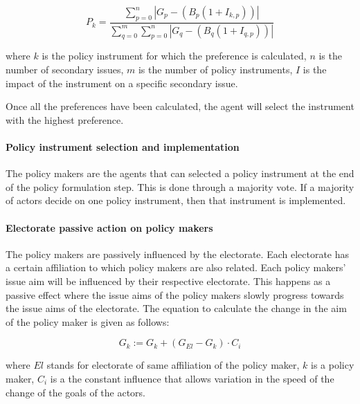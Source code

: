 \documentclass[11pt]{article}
\begin{document}
\begin{equation}
P_k = \frac{\sum_{p = 0}^{n} | G_{p} - \left( B_{p} (1 + I_{k,p}) \right) |}{\sum_{q = 0}^{m} \sum_{p = 0}^{n} | G_{q} - \left( B_{q} (1 + I_{q,p}) \right) |}
\end{equation}

where $k$ is the policy instrument for which the preference is calculated, $n$ is the number of secondary issues, $m$ is the number of policy instruments, $I$ is the impact of the instrument on a specific secondary issue.

Once all the preferences have been calculated, the agent will select the instrument with the highest preference.


\paragraph{Policy instrument selection and implementation}

The policy makers are the agents that can selected a policy instrument at the end of the policy formulation step. This is done through a majority vote. If a majority of actors decide on one policy instrument, then that instrument is implemented.


\paragraph{Electorate passive action on policy makers}

The policy makers are passively influenced by the electorate. Each electorate has a certain affiliation to which policy makers are also related. Each policy makers' issue aim will be influenced by their respective electorate. This happens as a passive effect where the issue aims of the policy makers slowly progress towards the issue aims of the electorate. The equation to calculate the change in the aim of the policy maker is given as follows:

\begin{equation}
G_{k} := G_{k} + \left(G_{El} - G_{k} \right) \cdot C_{i}
\end{equation}

where $El$ stands for electorate of same affiliation of the policy maker, $k$ is a policy maker, $C_i$ is a the constant influence that allows variation in the speed of the change of the goals of the actors.



\appendix


 

\end{document}
